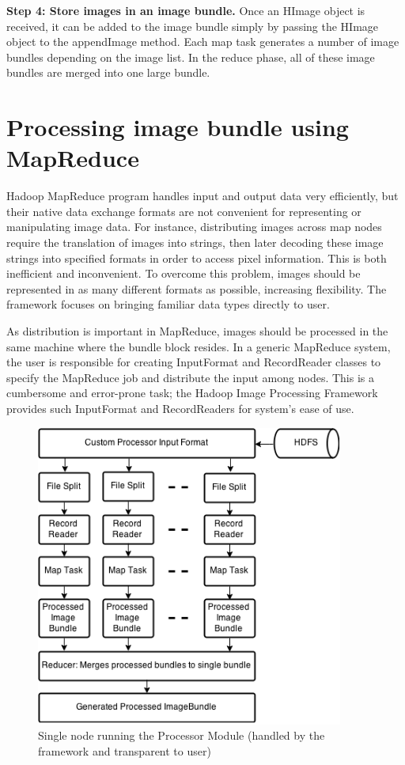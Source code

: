 \documentclass{osuthesis}
\begin{document}
				\textbf{ Step 4: Store images in an image bundle. }  Once an HImage
				object is received, it can be added to the image bundle simply by
				passing the HImage object to the appendImage method. Each map task
				generates a number of image bundles depending on the image list. In
				the reduce phase, all of these image bundles are merged into one large
				bundle.
				
				
				\section{Processing image bundle using MapReduce}
				Hadoop MapReduce program handles input and output data very
				efficiently, but their native data exchange formats are not convenient
				for representing or manipulating image data.  For instance,
				distributing images across map nodes require the translation of images
				into strings, then later decoding these image strings into specified
				formats in order to access pixel information.  This is both
				inefficient and inconvenient. To overcome this problem, images should
				be represented in as many different formats as possible, increasing
				flexibility. The framework focuses on bringing familiar data types
				directly to user.
				
				As distribution is important in MapReduce, images should be processed
				in the same machine where the bundle block resides. In a generic
				MapReduce system, the user is responsible for creating InputFormat and
				RecordReader classes to specify the MapReduce job and distribute the
				input among nodes. This is a cumbersome and error-prone task; the
				Hadoop Image Processing Framework provides such InputFormat and
				RecordReaders for system's ease of use.
				\begin{figure}[h]
					\centering
					\includegraphics[width=0.90\textwidth]{pro-node}
					\caption{Single node running the Processor Module (handled by
						the framework and transparent to user)}
					\label{fig:pro-node}
				\end{figure}
				
\end{document}
